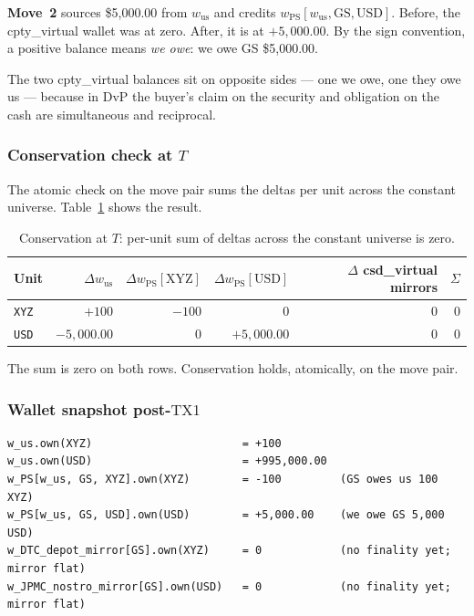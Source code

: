 \documentclass[11pt,a4paper]{article}
\begin{document}
\textbf{Move~2} sources \$5{,}000.00 from $w_{\mathrm{us}}$ and credits $w_{\mathrm{PS}}[w_{\mathrm{us}}, \mathrm{GS}, \mathrm{USD}]$. Before, the cpty\_virtual wallet was at zero. After, it is at $+5{,}000.00$. By the sign convention, a positive balance means \emph{we owe}: we owe GS \$5{,}000.00.

The two cpty\_virtual balances sit on opposite sides --- one we owe, one they owe us --- because in DvP the buyer's claim on the security and obligation on the cash are simultaneous and reciprocal.

\subsubsection*{Conservation check at $T$}

The atomic check on the move pair sums the deltas per unit across the constant universe. Table~\ref{tab:buy-T-conservation} shows the result.

\begin{table}[h]
\centering
\begin{tabular}{lrrrrr}
\toprule
\textbf{Unit} & $\Delta w_{\mathrm{us}}$ & $\Delta w_{\mathrm{PS}}[\mathrm{XYZ}]$ & $\Delta w_{\mathrm{PS}}[\mathrm{USD}]$ & $\Delta$ csd\_virtual mirrors & $\Sigma$ \\
\midrule
\texttt{XYZ} & $+100$           & $-100$           & $0$             & $0$           & $0$ \\
\texttt{USD} & $-5{,}000.00$    & $0$              & $+5{,}000.00$   & $0$           & $0$ \\
\bottomrule
\end{tabular}
\caption{Conservation at $T$: per-unit sum of deltas across the constant universe is zero.}
\label{tab:buy-T-conservation}
\end{table}

The sum is zero on both rows. Conservation holds, atomically, on the move pair.

\subsubsection*{Wallet snapshot post-$\mathrm{TX1}$}

\begin{lstlisting}
w_us.own(XYZ)                       = +100
w_us.own(USD)                       = +995,000.00
w_PS[w_us, GS, XYZ].own(XYZ)        = -100         (GS owes us 100 XYZ)
w_PS[w_us, GS, USD].own(USD)        = +5,000.00    (we owe GS 5,000 USD)
w_DTC_depot_mirror[GS].own(XYZ)     = 0            (no finality yet; mirror flat)
w_JPMC_nostro_mirror[GS].own(USD)   = 0            (no finality yet; mirror flat)
\end{lstlisting}
\end{document}
